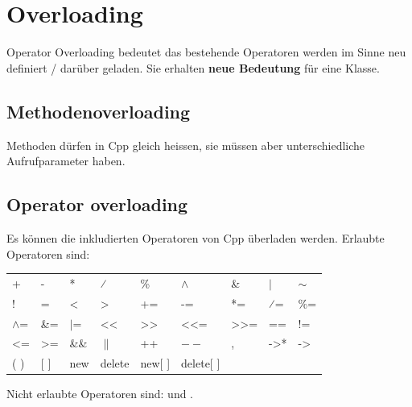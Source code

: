 \section{Overloading}

Operator Overloading bedeutet das bestehende Operatoren  werden im Sinne neu definiert / darüber geladen. 
Sie erhalten \textbf{neue Bedeutung} für eine Klasse.


\subsection{Methodenoverloading}

Methoden dürfen in Cpp gleich heissen, sie müssen aber unterschiedliche Aufrufparameter haben.



\subsection{Operator overloading}

Es können die inkludierten Operatoren von Cpp überladen werden. 
Erlaubte Operatoren sind:\\
\begin{tabular}{lllllllll}
    +            & -               & *           & ⁄                      & \%                           & $\wedge$                & \&                            & $|$              & $\sim$          \\
    !            & =               & \textless{} & \textgreater{}         & +=                           & -=                      & *=                            & ⁄=               & \%=             \\
    $\wedge$=    & \&=             & $|$=        & \textless{}\textless{} & \textgreater{}\textgreater{} & \textless{}\textless{}= & \textgreater{}\textgreater{}= & ==               & !=              \\
    \textless{}= & \textgreater{}= & \&\&        & $\|$                   & ++                           & $--$                    & ,                             & -\textgreater{}* & -\textgreater{} \\
    ( )          & {[} {]}         & new         & delete                 & new{[} {]}                   & delete{[} {]}           &                               &                  &                
\end{tabular}

Nicht erlaubte Operatoren sind:   \say{::} und .

